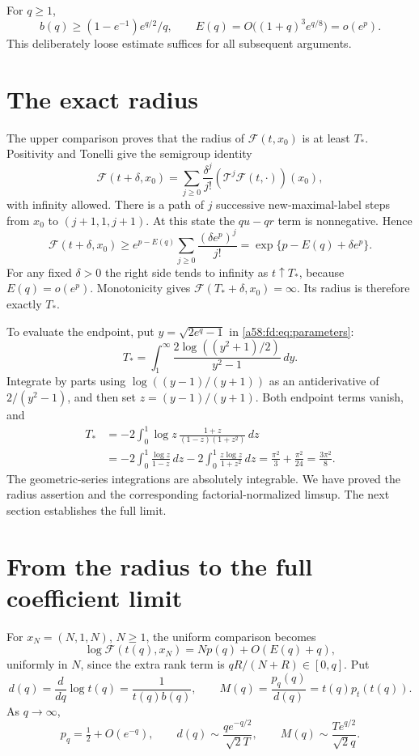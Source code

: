 \documentclass[11pt,letterpaper]{article}
\theoremstyle{remark}
\newcommand{\TT}{\mathcal T}
\begin{document}
For $q\ge1$,
\[
 b(q)\ge(1-e^{-1})e^{q/2}/q,
 \qquad E(q)=O\bigl((1+q)^3e^{q/8}\bigr)=o(e^p).
\]
This deliberately loose estimate suffices for all subsequent arguments.

\section{The exact radius}\label{a58:fd:sec:radius}
The upper comparison proves that the radius of $\mathcal F(t,x_0)$ is at least $T_*$. Positivity and Tonelli give the semigroup identity
\[
 \mathcal F(t+\delta,x_0)
 =\sum_{j\ge0}\frac{\delta^j}{j!}
       (\TT^j\mathcal F(t,\cdot))(x_0),
\]
with infinity allowed. There is a path of $j$ successive new-maximal-label steps from $x_0$ to $(j+1,1,j+1)$. At this state the $qu-qr$ term is nonnegative. Hence
\[
 \mathcal F(t+\delta,x_0)
 \ge e^{p-E(q)}\sum_{j\ge0}\frac{(\delta e^p)^j}{j!}
 =\exp\{p-E(q)+\delta e^p\}.
\]
For any fixed $\delta>0$ the right side tends to infinity as $t\uparrow T_*$, because $E(q)=o(e^p)$. Monotonicity gives $\mathcal F(T_*+\delta,x_0)=\infty$. Its radius is therefore exactly $T_*$.

To evaluate the endpoint, put $y=\sqrt{2e^q-1}$ in \eqref{a58:fd:eq:parameters}:
\[
 T_*=\int_1^\infty\frac{2\log((y^2+1)/2)}{y^2-1}\,dy.
\]
Integrate by parts using $\log((y-1)/(y+1))$ as an antiderivative of $2/(y^2-1)$, and then set $z=(y-1)/(y+1)$. Both endpoint terms vanish, and
\begin{align*}
 T_*&=-2\int_0^1\log z\,\frac{1+z}{(1-z)(1+z^2)}\,dz\\
 &=-2\int_0^1\frac{\log z}{1-z}\,dz
   -2\int_0^1\frac{z\log z}{1+z^2}\,dz
 =\frac{\pi^2}{3}+\frac{\pi^2}{24}=\frac{3\pi^2}{8}.
\end{align*}
The geometric-series integrations are absolutely integrable. We have proved the radius assertion and the corresponding factorial-normalized limsup. The next section establishes the full limit.

\section{From the radius to the full coefficient limit}\label{a58:fd:sec:fulllimit}
For $x_N=(N,1,N)$, $N\ge1$, the uniform comparison becomes
\begin{equation}\label{a58:fd:eq:growing}
 \log\mathcal F(t(q),x_N)=Np(q)+O(E(q)+q),
\end{equation}
uniformly in $N$, since the extra rank term is $qR/(N+R)\in[0,q]$.
Put
\[
 d(q)=\frac{d}{dq}\log t(q)=\frac1{t(q)b(q)},\qquad
 M(q)=\frac{p_q(q)}{d(q)}=t(q)p_t(t(q)).
\]
As $q\to\infty$,
\begin{equation}\label{a58:fd:eq:largescales}
 p_q=\tfrac12+O(e^{-q}),\qquad
 d(q)\sim\frac{q e^{-q/2}}{\sqrt2T},\qquad
 M(q)\sim\frac{T e^{q/2}}{\sqrt2q}.
\end{equation}
\end{document}
